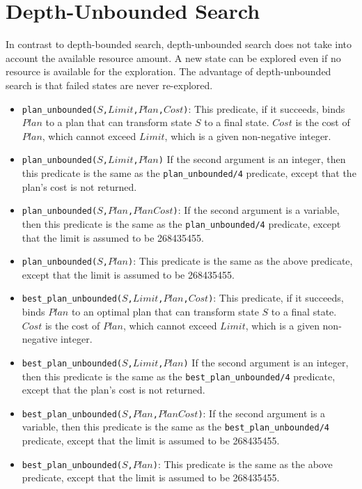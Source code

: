 \section{Depth-Unbounded Search}
In contrast to depth-bounded search, depth-unbounded search does not take into account the available resource amount. A new state can be explored even if no resource is available for the exploration. The advantage of depth-unbounded search is that failed states are never re-explored.

\begin{itemize}
\item \texttt{plan\_unbounded($S$,$Limit$,$Plan$,$Cost$)}: This predicate, if it succeeds, binds $Plan$ to a plan that can transform state $S$ to a final state. $Cost$ is the cost of $Plan$, which cannot exceed $Limit$, which is a given non-negative integer.

\item \texttt{plan\_unbounded($S$,$Limit$,$Plan$)} If the second argument is an integer, then this predicate is the same as the \texttt{plan\_unbounded/4} predicate, except that the plan's cost is not returned. 

\item \texttt{plan\_unbounded($S$,$Plan$,$PlanCost$)}: If the second argument is a variable, then this predicate is the same as the \texttt{plan\_unbounded/4} predicate, except that the limit is assumed to be 268435455.

\item \texttt{plan\_unbounded($S$,$Plan$)}: This predicate is the same as the above predicate, except that the limit is assumed to be 268435455.

\item \texttt{best\_plan\_unbounded($S$,$Limit$,$Plan$,$Cost$)}: This predicate, if it succeeds, binds $Plan$ to an optimal plan that can transform state $S$ to a final state. $Cost$ is the cost of $Plan$, which cannot exceed $Limit$, which is a given non-negative integer.

\item \texttt{best\_plan\_unbounded($S$,$Limit$,$Plan$)} If the second argument is an integer, then this predicate is the same as the \texttt{best\_plan\_unbounded/4} predicate, except that the plan's cost is not returned.

\item \texttt{best\_plan\_unbounded($S$,$Plan$,$PlanCost$)}: If the second argument is a variable, then this predicate is the same as the \texttt{best\_plan\_unbounded/4} predicate, except that the limit is assumed to be 268435455.

\item \texttt{best\_plan\_unbounded($S$,$Plan$)}: This predicate is the same as the above predicate, except that the limit is assumed to be 268435455.
\end{itemize}

